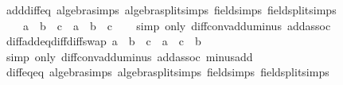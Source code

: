 \begin{isabellebody}
\endisatagproof
{\isafoldproof}%
%
\isadelimproof
\isanewline
%
\endisadelimproof
\isanewline
{}\isamarkupfalse%
\ add{\isacharunderscore}{\kern0pt}diff{\isacharunderscore}{\kern0pt}eq\ {\isacharbrackleft}{\kern0pt}algebra{\isacharunderscore}{\kern0pt}simps{\isacharcomma}{\kern0pt}\ algebra{\isacharunderscore}{\kern0pt}split{\isacharunderscore}{\kern0pt}simps{\isacharcomma}{\kern0pt}\ field{\isacharunderscore}{\kern0pt}simps{\isacharcomma}{\kern0pt}\ field{\isacharunderscore}{\kern0pt}split{\isacharunderscore}{\kern0pt}simps{\isacharbrackright}{\kern0pt}{\isacharcolon}{\kern0pt}\isanewline
\ \ \ \ {\isachardoublequoteopen}a\ {\isacharplus}{\kern0pt}\ {\isacharparenleft}{\kern0pt}b\ {\isacharminus}{\kern0pt}\ c{\isacharparenright}{\kern0pt}\ {\isacharequal}{\kern0pt}\ {\isacharparenleft}{\kern0pt}a\ {\isacharplus}{\kern0pt}\ b{\isacharparenright}{\kern0pt}\ {\isacharminus}{\kern0pt}\ c{\isachardoublequoteclose}\isanewline
%
\isadelimproof
\ \ %
\endisadelimproof
%
\isatagproof
{}\isamarkupfalse%
\ {\isacharparenleft}{\kern0pt}simp\ only{\isacharcolon}{\kern0pt}\ diff{\isacharunderscore}{\kern0pt}conv{\isacharunderscore}{\kern0pt}add{\isacharunderscore}{\kern0pt}uminus\ add{\isachardot}{\kern0pt}assoc{\isacharparenright}{\kern0pt}%
\endisatagproof
{\isafoldproof}%
%
\isadelimproof
\isanewline
%
\endisadelimproof
\isanewline
{}\isamarkupfalse%
\ diff{\isacharunderscore}{\kern0pt}add{\isacharunderscore}{\kern0pt}eq{\isacharunderscore}{\kern0pt}diff{\isacharunderscore}{\kern0pt}diff{\isacharunderscore}{\kern0pt}swap{\isacharcolon}{\kern0pt}\ {\isachardoublequoteopen}a\ {\isacharminus}{\kern0pt}\ {\isacharparenleft}{\kern0pt}b\ {\isacharplus}{\kern0pt}\ c{\isacharparenright}{\kern0pt}\ {\isacharequal}{\kern0pt}\ a\ {\isacharminus}{\kern0pt}\ c\ {\isacharminus}{\kern0pt}\ b{\isachardoublequoteclose}\isanewline
%
\isadelimproof
\ \ %
\endisadelimproof
%
\isatagproof
{}\isamarkupfalse%
\ {\isacharparenleft}{\kern0pt}simp\ only{\isacharcolon}{\kern0pt}\ diff{\isacharunderscore}{\kern0pt}conv{\isacharunderscore}{\kern0pt}add{\isacharunderscore}{\kern0pt}uminus\ add{\isachardot}{\kern0pt}assoc\ minus{\isacharunderscore}{\kern0pt}add{\isacharparenright}{\kern0pt}%
\endisatagproof
{\isafoldproof}%
%
\isadelimproof
\isanewline
%
\endisadelimproof
\isanewline
{}\isamarkupfalse%
\ diff{\isacharunderscore}{\kern0pt}eq{\isacharunderscore}{\kern0pt}eq\ {\isacharbrackleft}{\kern0pt}algebra{\isacharunderscore}{\kern0pt}simps{\isacharcomma}{\kern0pt}\ algebra{\isacharunderscore}{\kern0pt}split{\isacharunderscore}{\kern0pt}simps{\isacharcomma}{\kern0pt}\ field{\isacharunderscore}{\kern0pt}simps{\isacharcomma}{\kern0pt}\ field{\isacharunderscore}{\kern0pt}split{\isacharunderscore}{\kern0pt}simps{\isacharbrackright}{\kern0pt}{\isacharcolon}{\kern0pt}\isanewline

\end{isabellebody}
